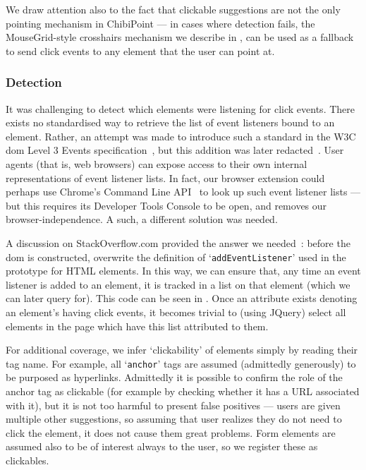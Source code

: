 \documentclass[11pt,openright,a4paper]{report}
\begin{document}
We draw attention also to the fact that clickable suggestions are not the only pointing mechanism in ChibiPoint --- in cases where detection fails, the MouseGrid-style crosshairs mechanism we describe in , can be used as a fallback to send click events to any element that the user can point at.

\subsubsection{Detection}
It was challenging to detect which elements were listening for click events. There exists no standardised way to retrieve the list of event listeners bound to an element. Rather, an attempt was made to introduce such a standard in the W3C \gls{dom} Level 3 Events specification~\cite{dom3attempt}, but this addition was later redacted~\cite{domlevel3}. User agents (that is, web browsers) can expose access to their own internal representations of event listener lists. In fact, our browser extension could perhaps use Chrome's Command Line API~\cite{commandlineapi} to look up such event listener lists --- but this requires its Developer Tools Console to be open, and removes our browser-independence. A such, a different solution was needed.

A discussion on StackOverflow.com provided the answer we needed~\cite{eventlistenerprototype}: before the \gls{dom} is constructed, overwrite the definition of `\texttt{addEventListener}' used in the prototype for HTML elements. In this way, we can ensure that, any time an event listener is added to an element, it is tracked in a list on that element (which we can later query for). This code can be seen in . Once an attribute exists denoting an element's having click events, it becomes trivial to (using JQuery) select all elements in the page which have this list attributed to them.

For additional coverage, we infer `clickability' of elements simply by reading their tag name. For example, all `\texttt{anchor}' tags are assumed (admittedly generously) to be purposed as hyperlinks. Admittedly it is possible to confirm the role of the anchor tag as clickable (for example by checking whether it has a URL associated with it), but it is not too harmful to present false positives --- users are given multiple other suggestions, so assuming that user realizes they do not need to click the element, it does not cause them great problems. Form elements are assumed also to be of interest always to the user, so we register these as clickables.
\end{document}
